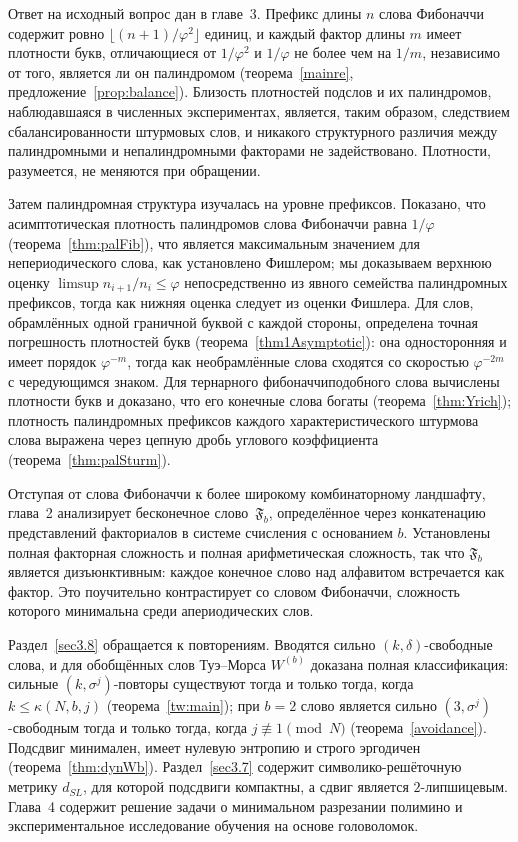 \documentclass[a4paper,14pt]{extreport}
\theoremstyle{plain}
\theoremstyle{definition}
\theoremstyle{remark}
\begin{document}
Ответ на исходный вопрос дан в главе~3. Префикс длины $n$ слова Фибоначчи содержит ровно $\lfloor(n+1)/\varphi^{2}\rfloor$ единиц, и каждый фактор длины $m$ имеет плотности букв, отличающиеся от $1/\varphi^{2}$ и $1/\varphi$ не более чем на $1/m$, независимо от того, является ли он палиндромом (теорема~\ref{mainre}, предложение~\ref{prop:balance}). Близость плотностей подслов и их палиндромов, наблюдавшаяся в численных экспериментах, является, таким образом, следствием сбалансированности штурмовых слов, и никакого структурного различия между палиндромными и непалиндромными факторами не задействовано. Плотности, разумеется, не меняются при обращении.

Затем палиндромная структура изучалась на уровне префиксов. Показано, что асимптотическая плотность палиндромов слова Фибоначчи равна $1/\varphi$ (теорема~\ref{thm:palFib}), что является максимальным значением для непериодического слова, как установлено Фишлером; мы доказываем верхнюю оценку $\limsup n_{i+1}/n_i\le\varphi$ непосредственно из явного семейства палиндромных префиксов, тогда как нижняя оценка следует из оценки Фишлера.
Для слов, обрамлённых одной граничной буквой с каждой стороны, определена точная погрешность плотностей букв (теорема~\ref{thm1Asymptotic}): она односторонняя и имеет порядок $\varphi^{-m}$, тогда как необрамлённые слова сходятся со скоростью $\varphi^{-2m}$ с чередующимся знаком. Для тернарного фибоначчиподобного слова вычислены плотности букв и доказано, что его конечные слова богаты (теорема~\ref{thm:Yrich});
плотность палиндромных префиксов каждого характеристического штурмова слова выражена через цепную дробь углового коэффициента (теорема~\ref{thm:palSturm}).

Отступая от слова Фибоначчи к более широкому комбинаторному ландшафту, глава~2 анализирует бесконечное слово~$\mathfrak{F}_{b}$, определённое через конкатенацию представлений факториалов в системе счисления с основанием $b$. Установлены полная факторная сложность и полная арифметическая сложность, так что $\mathfrak{F}_{b}$ является дизъюнктивным: каждое конечное слово над алфавитом встречается как фактор. Это поучительно контрастирует со словом Фибоначчи, сложность которого минимальна среди апериодических слов.

Раздел~\ref{sec3.8} обращается к повторениям. Вводятся сильно $(k,\delta)$-свободные слова, и для обобщённых слов Туэ--Морса $W^{(b)}$ доказана полная классификация: сильные $(k,\sigma^j)$-повторы существуют тогда и только тогда, когда $k\le\kappa(N,b,j)$ (теорема~\ref{tw:main}); при $b=2$ слово является сильно $(3,\sigma^j)$-свободным тогда и только тогда, когда $j\not\equiv1\pmod N$ (теорема~\ref{avoidance}). Подсдвиг минимален, имеет нулевую энтропию и строго эргодичен (теорема~\ref{thm:dynWb}). Раздел~\ref{sec3.7} содержит символико-решёточную метрику $d_{SL}$, для которой подсдвиги компактны, а сдвиг является $2$-липшицевым. Глава~4 содержит решение задачи о минимальном разрезании полимино и экспериментальное исследование обучения на основе головоломок.
\end{document}
